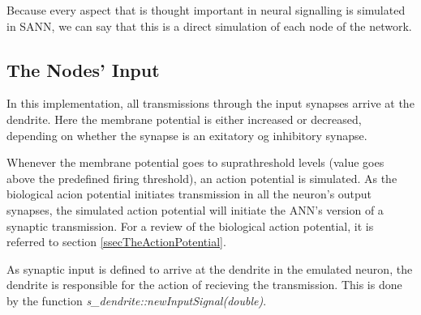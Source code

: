 	Because every aspect that is thought important in neural signalling is simulated in SANN, 
		we can say that this is a direct simulation of each node of the network.   %
	

	\subsection{The Nodes' Input}
	In this implementation, all transmissions through the input synapses arrive at the dendrite.
	Here the membrane potential is either increased or decreased, depending on whether the synapse is an exitatory og inhibitory synapse.

	Whenever the membrane potential goes to suprathreshold levels (value goes above the predefined firing threshold), an action potential is simulated.
	As the biological acion potential initiates transmission in all the neuron's output synapses, the simulated action potential will initiate the ANN's version of a synaptic transmission.
	For a review of the biological action potential, it is referred to section \ref{ssecTheActionPotential}. %
	

	As synaptic input is defined to arrive at the dendrite in the emulated neuron, the dendrite is responsible for the action of recieving the transmission.
	This is done by the function \emph{s\_dendrite::newInputSignal(double)}.
	

